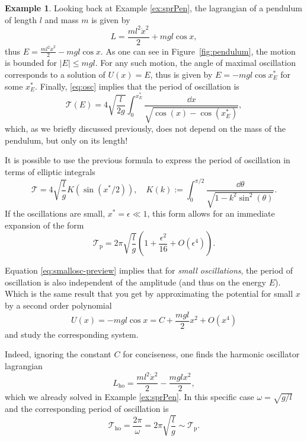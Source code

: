 \documentclass[english,fontsize=11pt,paper=b5]{scrbook}
\numberwithin{equation}{chapter}
\theoremstyle{definition}
\newtheorem{example}{Example}[chapter]
\begin{document}
    \begin{example}\label{ex:small-osc}
      Looking back at Example \ref{ex:sprPen}, the lagrangian of a pendulum of length $l$ and mass $m$ is given by
      \begin{equation}
        L = \frac{ml^2 \dot x^2}2 + mgl \cos x,
      \end{equation}
      thus $E = \frac{ml^2 \dot x^2}2 - mgl \cos x$.
      As one can see in Figure~\ref{fig:pendulum}, the motion is bounded for $|E| \leq mgl$. For any such motion, the angle of maximal oscillation corresponds to a solution of $U(x) = E$, thus is given by $E = -mgl \cos x^*_E$ for some $x^*_E$.
      Finally, \eqref{eq:osc} implies that the period of oscillation is
      \begin{equation}
        \mathcal{T}(E) = 4 \sqrt{\frac l{2g}} \int_0^{x^*_E} \frac{\dd x}{\sqrt{\cos(x) - \cos(x^*_E)}},
      \end{equation}
      which, as we briefly discussed previously, does not depend on the mass of the pendulum, but only on its length!

      It is possible to use the previous formula to express the period of oscillation in terms of elliptic integrals
      \begin{equation}
        \mathcal{T} = 4 \sqrt{\frac lg} K\left (\sin(x^*/2)\right), \quad
        K(k):= \int_0^{\pi/2} \frac{\dd \theta}{\sqrt{1 - k^2\sin^2(\theta)}}.
      \end{equation}
      If the oscillations are small, $x^* = \epsilon \ll 1$, this form allows for an immediate expansion of the form
      \begin{equation}\label{eq:smallosc-preview}
        \mathcal{T}_\mathrm{p} = 2\pi \sqrt{\frac lg} \left(1 + \frac{\epsilon^2}{16} + O(\epsilon^4)\right).
      \end{equation}

      Equation \eqref{eq:smallosc-preview} implies that for \emph{small oscillations}, the period of oscillation is also independent of the amplitude (and thus on the energy $E$). Which is the same result that you get by approximating the potential for small $x$ by a second order polynomial
      \begin{equation}
        U(x) = -mgl \cos x = C + \frac{mgl}2 x^2 + O(x^4)
      \end{equation}
      and study the corresponding system.

      Indeed, ignoring the constant $C$ for conciseness, one finds the harmonic oscillator lagrangian
      \begin{equation}
        L_{\mathrm{ho}} = \frac{ml^2 \dot x^2}{2} - \frac{mgl x^2}{2},
      \end{equation}
      which we already solved in Example \ref{ex:sprPen}.
      In this specific case $\omega = \sqrt{g/l}$ and the corresponding period of oscillation is
      \begin{equation}
        \mathcal{T}_{\mathrm{ho}} = \frac{2\pi}\omega = 2\pi \sqrt{\frac lg} \sim \mathcal{T}_\mathrm{p}.
      \end{equation}


\end{example}
\end{document}
